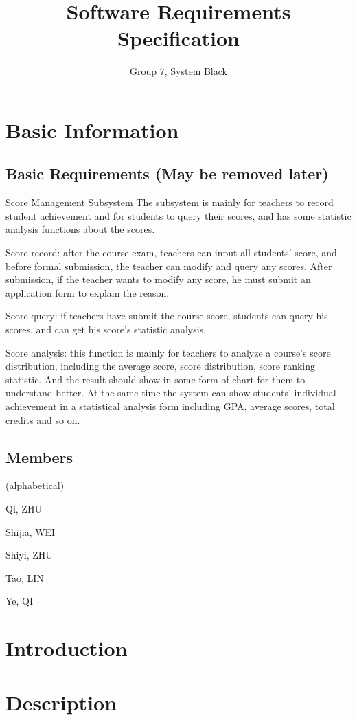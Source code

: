 \documentclass[a4]{article}
\author{Group 7, System Black}
\title{Software Requirements Specification}
\begin{document}
\maketitle

\section{Basic Information}
\subsection{Basic Requirements (May be removed later)}
Score Management Subsystem
The subsystem is mainly for teachers to record student achievement and for students to query their scores, and has some statistic analysis functions about the scores.

Score record: after the course exam, teachers can input all students' score, and before formal submission, the teacher can modify and query any scores. After submission, if the teacher
wants to modify any score, he must submit an application form to explain the reason.

Score query: if teachers have submit the course score, students can query his scores, and can get his score's statistic analysis.

Score analysis: this function is mainly for teachers to analyze a course's score distribution, including the average score, score distribution, score ranking statistic. And the result should
show in some form of chart for them to understand better. At the same time the system can show students’ individual achievement in a statistical analysis form including GPA, average scores, total credits and so on.

\subsection{Members}
(alphabetical)

Qi, ZHU

Shijia, WEI

Shiyi, ZHU

Tao, LIN

Ye, QI

\section{Introduction}

\section{Description}
\end{document}
